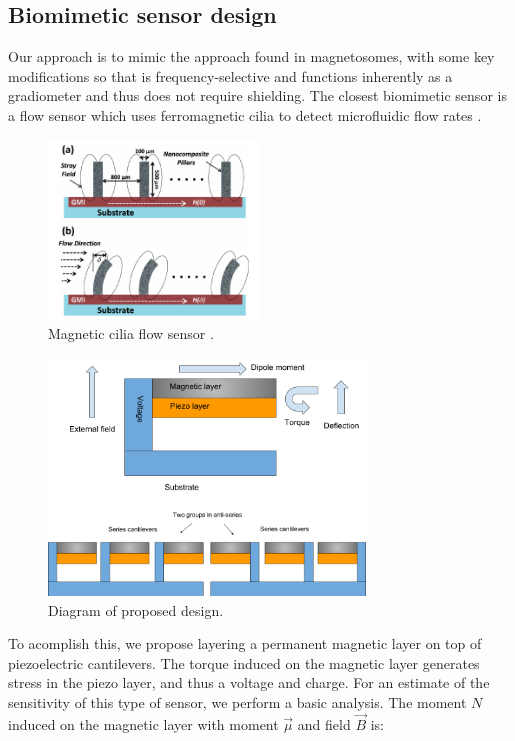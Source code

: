 \subsection{Biomimetic sensor design}

Our approach is to mimic the approach found in magnetosomes, with some key modifications so that is frequency-selective and functions inherently as a gradiometer and thus does not require shielding. The closest biomimetic sensor is a flow sensor which uses ferromagnetic cilia to detect microfluidic flow rates \cite{alfadhel2014magnetic}.

\begin{figure}[h]
\centering
\includegraphics[width=0.5\textwidth]{cilia}
\caption{Magnetic cilia flow sensor \cite{alfadhel2014magnetic}.}
\label{fig:cilia}
\end{figure}

\begin{figure}
\centering
\includegraphics[width=0.75\textwidth]{biomag}
\caption{Diagram of proposed design.}
\label{fig:diagram}
\end{figure}

To acomplish this, we propose layering a permanent magnetic layer on top of piezoelectric cantilevers. The torque induced on the magnetic layer generates stress in the piezo layer, and thus a voltage and charge. For an estimate of the sensitivity of this type of sensor, we perform a basic analysis. The moment $N$ induced on the magnetic layer with moment $\vec{\mu}$ and field $\vec{B}$ is:



